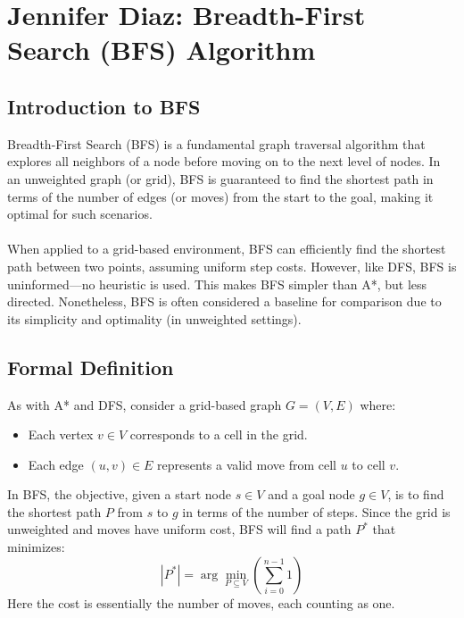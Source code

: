 \documentclass[12pt]{article}
\begin{document}
\section{Jennifer Diaz: Breadth-First Search (BFS) Algorithm}
\subsection{Introduction to BFS}
Breadth-First Search (BFS) is a fundamental graph traversal algorithm that explores all neighbors of a node before moving on to the next level of nodes. In an unweighted graph (or grid), BFS is guaranteed to find the shortest path in terms of the number of edges (or moves) from the start to the goal, making it optimal for such scenarios.
\\
\\
When applied to a grid-based environment, BFS can efficiently find the shortest path between two points, assuming uniform step costs. However, like DFS, BFS is uninformed—no heuristic is used. This makes BFS simpler than A*, but less directed. Nonetheless, BFS is often considered a baseline for comparison due to its simplicity and optimality (in unweighted settings).

\subsection{Formal Definition}
As with A* and DFS, consider a grid-based graph \( G = (V, E) \) where:
\begin{itemize}
    \item Each vertex \( v \in V \) corresponds to a cell in the grid.
    \item Each edge \( (u, v) \in E \) represents a valid move from cell \( u \) to cell \( v \).
\end{itemize}

\noindent In BFS, the objective, given a start node \( s \in V \) and a goal node \( g \in V \), is to find the shortest path \( P \) from \( s \) to \( g \) in terms of the number of steps. Since the grid is unweighted and moves have uniform cost, BFS will find a path \( P^* \) that minimizes:
\[
|P^*| = \arg\min_{P \subseteq V} \left( \sum_{i=0}^{n-1} 1 \right)
\]
\noindent Here the cost is essentially the number of moves, each counting as one.
\end{document}
